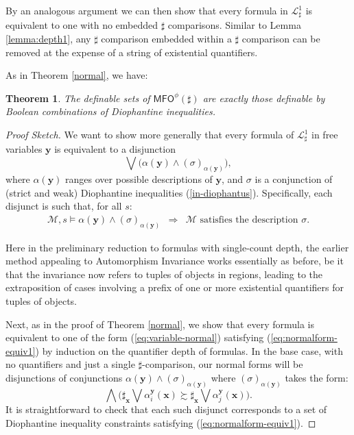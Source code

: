 \documentclass[12pt,oneside,reqno]{amsart}
\newtheorem{theorem}{Theorem}
\theoremstyle{definition}
\begin{document}
By an analogous argument we can then show that every formula in $\mathcal{L}^1_{\sharp}$ is equivalent to one with no embedded $\sharp$ comparisons. Similar to Lemma \ref{lemma:depth1}, any $\sharp$ comparison embedded within a $\sharp$ comparison can be removed at the expense of a string of existential quantifiers.  

As in Theorem \ref{normal}, we have: 

\begin{theorem} The definable sets of $\mathsf{MFO}^{\phi}(\sharp)$ are exactly those definable by Boolean combinations of Diophantine inequalities. \label{thm:mfosharp}
\end{theorem}
\begin{proof}[Proof Sketch] We want to show more generally that every formula of $\mathcal{L}^1_{\sharp}$ in free variables $\mathbf{y}$ is equivalent to a disjunction \begin{equation} \bigvee \big(\alpha(\mathbf{y}) \wedge (\sigma)_{\alpha(\mathbf{y})}\big),
    \label{eq:variable-normal}
\end{equation} where $\alpha(\mathbf{y})$ ranges over possible descriptions of $\mathbf{y}$, and $\sigma$ is a conjunction of (strict and weak) Diophantine inequalities (\ref{in-diophantus}). Specifically, each disjunct is such that, for all $s$: \begin{eqnarray} \mathcal{M},s \vDash \alpha(\mathbf{y}) \wedge  (\sigma)_{\alpha(\mathbf{y})} & \Rightarrow & \mathcal{M}\mbox{ satisfies the description }\sigma. \label{eq:normalform-equiv1}
\end{eqnarray}

Here in the preliminary reduction to formulas with  single-count depth, the earlier method appealing to Automorphism Invariance works essentially as before, be it that the invariance now refers to tuples of objects in regions, leading to the extraposition of cases involving a prefix of one or more existential quantifiers for tuples of objects.

Next, as in the proof of Theorem \ref{normal}, we show that every formula is equivalent to one of the form (\ref{eq:variable-normal}) satisfying (\ref{eq:normalform-equiv1}) by induction on the quantifier depth of formulas. In the base case, with no quantifiers and just a single $\sharp$-comparison, our normal forms will be disjunctions of conjunctions $\alpha(\mathbf{y}) \wedge (\sigma)_{\alpha(\mathbf{y})}$ where $(\sigma)_{\alpha(\mathbf{y})}$ takes the form: \begin{equation} \bigwedge \Big(  \sharp_{\mathbf{x}} \bigvee \alpha_i^{\mathbf{y}}(\mathbf{x}) \succsim \sharp_{\mathbf{x}} \bigvee \alpha_j^{\mathbf{y}}(\mathbf{x})  \Big) . \nonumber
\end{equation} It is straightforward to check that each such disjunct corresponds to a set of Diophantine inequality constraints satisfying (\ref{eq:normalform-equiv1}). 


\end{proof}
\end{document}
